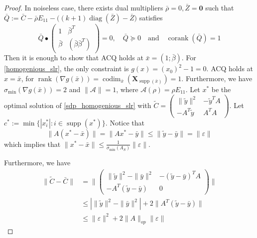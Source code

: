 \documentclass[11pt]{amsart}
\theoremstyle{plain}
\theoremstyle{definition}
\theoremstyle{remark}
\newcommand{\vX}{{\mathbf{X}}}
\newcommand{\cA}{{\mathcal{A}}}
\newcommand{\vzero}{\mathbf{0}}
\DeclareMathOperator{\rank}{rank}
\DeclareMathOperator{\corank}{corank}
\DeclareMathOperator{\codim}{codim}
\DeclareMathOperator{\diag}{diag}
\DeclareMathOperator{\supp}{supp}
\begin{document}
	\begin{proof}
		In noiseless case, there exists dual multipliers \(\bar \rho = 0, \bar Z = \vzero\) such that \(\bar Q:=\bar C - \bar \rho E_{11} - \big((k+1)\diag(\bar Z)-\bar Z\big)\) satisfies 
		\[
		\bar Q \bullet \left(\begin{smallmatrix}
			1 & \bar\beta^T\\
			\bar\beta & (\bar\beta\bar\beta^T)
		\end{smallmatrix}\right)=0,\quad\bar Q \succeq 0 \quad\text{and}\quad \corank(\bar Q)=1
		\]
		Then it is enough to show that ACQ holds at \(\bar x = (1;\bar \beta) \). For \eqref{homogenious_slr}, the only constraint is $g(x) = (x_0)^2-1 = 0$. ACQ holds at $x = \bar x$, for $\rank(\nabla g(\bar x))  = \codim_{\bar x} (\vX_{\supp(\bar x)}) = 1$. Furthermore, we have \(\sigma_{\min}(\nabla g(\bar x))=2\) and \(\|\cA\|=1\), where \(\cA(\rho) = \rho E_{11}\). Let \(x^*\) be the optimal solution of \eqref{sdp_homogenious_slr} with \(\tilde C = \left(\begin{smallmatrix}
			\|\tilde y\|^2 & -\tilde y^T A\\
			-A^T\tilde y & A^TA
		\end{smallmatrix}\right)\). Let \(c^*:=\min\{|x^*_i|: i\in\supp(x^*)\}\). Notice that
		\begin{equation}
			\|A(x^* - \bar x)\| = \|Ax^* - \bar y\| \leq \|\tilde y - \bar y\| = \|\varepsilon\|
		\end{equation}
		which implies that \(\|x^* - \bar x\| \leq \tfrac{1}{\sigma_{\min}(A_S)}\|\varepsilon\|\).
		
		Furthermore, we have
		\begin{equation}
			\begin{split}
				\|\tilde C - \bar C\| &= \Big\|\left(\begin{smallmatrix}
					\|\tilde y\|^2 - \|\bar y\|^2 & -(\tilde y - \bar y)^T A\\
					-A^T(\tilde y - \bar y) & 0
				\end{smallmatrix}\right)\Big\|\\
				&\leq |\|\tilde y\|^2 - \|\bar y\|^2| + 2\|A^T(\tilde y - \bar y)\|\\
				&\leq \|\varepsilon\|^2 + 2\|A\|_{op}\|\varepsilon\|
			\end{split}
		\end{equation}
		

\end{proof}
\end{document}
